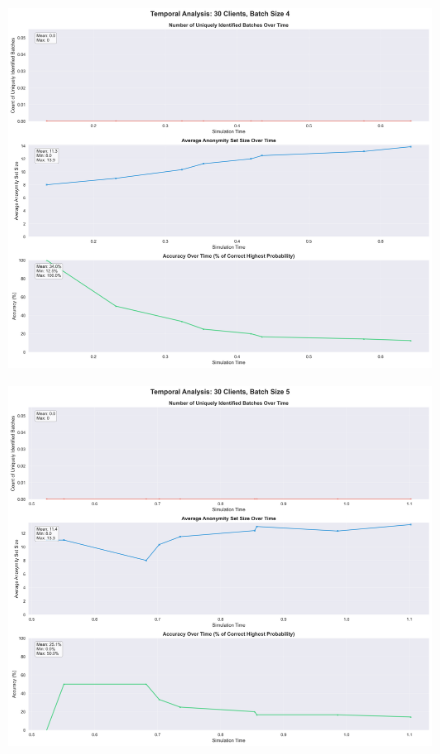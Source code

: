 \documentclass[twocolumn]{article}
\begin{document}
\begin{figure}[!htb]
\centering
\includegraphics[width=\textwidth]{diagrams/temporal_analysis_30_4.png}
\label{fig:temporal_analysis_30_4}
\end{figure}

\begin{figure}[!htb]
\centering
\includegraphics[width=\textwidth]{diagrams/temporal_analysis_30_5.png}
\label{fig:temporal_analysis_30_5}
\end{figure}
\end{document}
